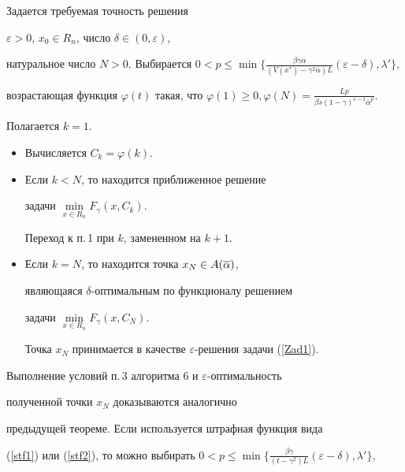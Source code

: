 \begin{alg}


Задается требуемая точность решения


$\varepsilon>0$, $x_0\in R_n$, число $\delta\in (0,\varepsilon)$,


натуральное число $N>0$. Выбирается $0<


p\leq\min\{\frac{\beta\gamma\overline\alpha}


{(V(x^*)-\gamma^2\overline\alpha)L}(\varepsilon-\delta),\lambda'\}$,


возрастающая функция $\varphi(t)$ такая, что $\varphi(1)\geq 0,


\varphi(N)=\frac{Lp}{\beta s(1-\gamma)^{s-1}\overline\alpha^p}$.


Полагается $k=1$.


\begin{itemize}


\item[1.] Вычисляется $C_k=\varphi(k)$.


\item[2.] Если $k<N$, то находится приближенное решение


задачи $\min\limits_{x\in R_n}F_\gamma(x,C_k)$.


Переход к п.\,1 при $k$, замененном на $k+1$.


\item[3.] Если $k=N$, то находится точка $x_N\in A(\overline\alpha)$, 


являющаяся $\delta$-оптимальным по функционалу решением


задачи $\min\limits_{x\in R_n}F_\gamma(x,C_N)$. 


Точка $x_N$ принимается в качестве $\varepsilon$-решения задачи (\ref{Zad1}).


\end{itemize}


\end{alg}





Выполнение условий п.\,3 алгоритма 6 и $\varepsilon$-оптимальность 


полученной точки $x_N$ доказываются аналогично


предыдущей теореме. Если используется штрафная функция вида


(\ref{stf1}) или (\ref{stf2}), то можно выбирать $0<


p\leq\min\{\frac{\beta\gamma}{(t-\gamma^2)L}(\varepsilon-\delta),\lambda'\}$,


